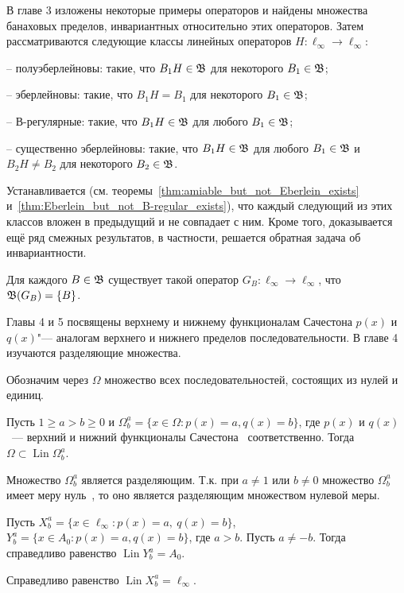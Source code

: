 В главе 3 изложены некоторые примеры операторов и найдены множества банаховых пределов,
инвариантных относительно этих операторов.
Затем рассматриваются следующие классы линейных операторов $H:\ell_\infty \to \ell_\infty$:

-- полуэберлейновы: такие, что $B_1 H \in\mathfrak{B}$ для некоторого $B_1\in \mathfrak{B}$;

-- эберлейновы: такие, что $B_1 H = B_1$ для некоторого $B_1\in \mathfrak{B}$;

-- В-регулярные: такие, что $B_1 H \in \mathfrak{B}$ для любого   $B_1\in \mathfrak{B}$;

-- существенно эберлейновы: такие, что $B_1 H \in \mathfrak{B}$ для любого $B_1\in \mathfrak{B}$ и $B_2 H \ne B_2$ для некоторого $B_2\in \mathfrak{B}$.

Устанавливается (см. теоремы~\ref{thm:amiable_but_not_Eberlein_exists} и~\ref{thm:Eberlein_but_not_B-regular_exists}),
что каждый следующий из этих классов вложен в предыдущий и не совпадает с ним.
Кроме того, доказывается ещё ряд смежных результатов, в частности, решается обратная задача об инвариантности.

	Для каждого $B\in \mathfrak{B}$ существует такой оператор $G_B:\ell_\infty \to \ell_\infty$,
	что $\mathfrak{B}(G_B) = \{B\}$.


Главы 4 и 5 посвящены верхнему и нижнему функционалам Сачестона $p(x)$ и $q(x)$"--- аналогам верхнего и нижнего пределов последовательности.
В главе 4 изучаются разделяющие множества.

Обозначим через $\Omega$ множество всех последовательностей, состоящих из нулей и единиц.

	Пусть
	$1 \geq a > b \geq 0$ и
	$\Omega^a_b = \{x\in\Omega : p(x) = a, q(x) = b\}$,
	где $p(x)$ и $q(x)$~--- верхний и нижний функционалы Сачестона~\cite{sucheston1967banach} соответственно.
	Тогда $\Omega \subset \operatorname{Lin} \Omega^a_b$.


	Множество $\Omega^a_b$ является разделяющим.
	Т.к. при $a\neq 1$ или $b\neq 0$ множество $\Omega^a_b$ имеет меру нуль~\cite{semenov2010characteristic,connor1990almost},
	то оно является разделяющим множеством нулевой меры.


Пусть $X^a_b = \{x\in\ell_\infty : p(x) = a,~ q(x) = b\}$, $Y^a_b = \{x\in A_0 : p(x) = a, q(x) = b\}$, где $a>b$.
	Пусть $a\neq -b$.
	Тогда справедливо равенство $\operatorname{Lin} Y^a_b = A_0$.

	Справедливо равенство $\operatorname{Lin} X^a_b = \ell_\infty$.

